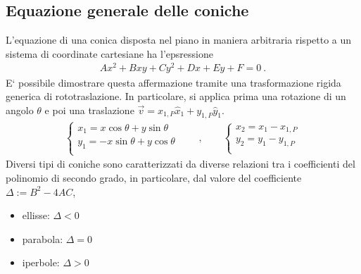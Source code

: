 \documentclass[letterpaper,10pt,italian]{jupyterBook}
\begin{document}
\subsection{Equazione generale delle coniche}
\label{\detokenize{ch/analytic_geometry/analytic_geometry_2d/conics-general:equazione-generale-delle-coniche}}\label{\detokenize{ch/analytic_geometry/analytic_geometry_2d/conics-general:geometry-analytic-2d-conics-general}}\label{\detokenize{ch/analytic_geometry/analytic_geometry_2d/conics-general::doc}}
\sphinxAtStartPar
L’equazione di una conica disposta nel piano in maniera arbitraria rispetto a un sistema di coordinate cartesiane ha l’epsressione
\begin{equation*}
\begin{split}A x^2 + B x y + C y^2 + D x + E y + F = 0 \ .\end{split}
\end{equation*}
\sphinxAtStartPar
E` possibile dimostrare questa affermazione tramite una trasformazione rigida generica di roto\sphinxhyphen{}traslazione. In particolare, si applica prima una rotazione di un angolo \(\theta\) e poi una traslazione \(\vec{v} = x_{1,P} \hat{x}_1 + y_{1,P} \hat{y}_1\).
\begin{equation*}
\begin{split}
\begin{cases}
x_1 =   x \cos \theta + y \sin \theta \\
y_1 = - x \sin \theta + y \cos \theta \\
\end{cases}
\qquad , \qquad
\begin{cases}
x_2 = x_1 - x_{1,P}  \\
y_2 = y_1 - y_{1,P}  \\
\end{cases}
\end{split}
\end{equation*}
\sphinxAtStartPar
Diversi tipi di coniche sono caratterizzati da diverse relazioni tra i coefficienti del polinomio di secondo grado, in particolare, dal valore del coefficiente \(\Delta := B^2 - 4 A C\),
\begin{itemize}
\item {} 
\sphinxAtStartPar
ellisse:  \(\Delta < 0\)

\item {} 
\sphinxAtStartPar
parabola: \(\Delta = 0\)

\item {} 
\sphinxAtStartPar
iperbole: \(\Delta > 0\)

\end{itemize}
\end{document}
